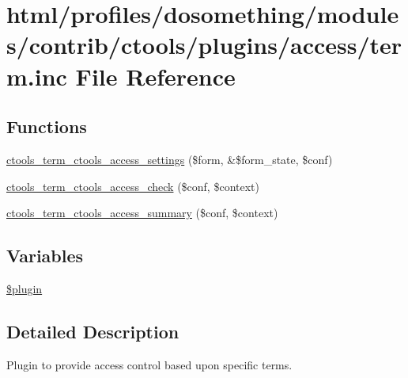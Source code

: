 \hypertarget{access_2term_8inc}{
\section{html/profiles/dosomething/modules/contrib/ctools/plugins/access/term.inc File Reference}
\label{access_2term_8inc}
}
\subsection*{Functions}
\begin{DoxyCompactItemize}
\item 
\hyperlink{access_2term_8inc_a4e7a22eadf67fe18cec6795e81b38028}{ctools\_\-term\_\-ctools\_\-access\_\-settings} (\$form, \&\$form\_\-state, \$conf)
\item 
\hyperlink{access_2term_8inc_a62d339b0ab972f44f9b35b30e2bcc8f1}{ctools\_\-term\_\-ctools\_\-access\_\-check} (\$conf, \$context)
\item 
\hyperlink{access_2term_8inc_a6be495cdfeabc7ef890ec0e740051735}{ctools\_\-term\_\-ctools\_\-access\_\-summary} (\$conf, \$context)
\end{DoxyCompactItemize}
\subsection*{Variables}
\begin{DoxyCompactItemize}
\item 
\hyperlink{access_2term_8inc_ada8a7130088351710bb02ed622d6bf65}{\$plugin}
\end{DoxyCompactItemize}


\subsection{Detailed Description}
Plugin to provide access control based upon specific terms. 

